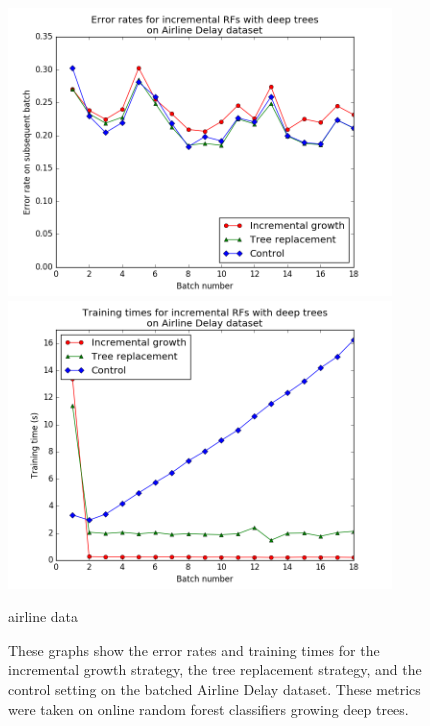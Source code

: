 \begin{figure}
  \centering
  \includegraphics[width=4in]{planedeep_line}
  \includegraphics[width=4in]{planedeep_line_time}
  \caption{airline data}
  \caption{These graphs show the error rates and training times for the
incremental growth strategy, the tree replacement strategy, and the control
setting on the batched Airline Delay dataset. These metrics
were taken on online random forest classifiers growing deep trees.}
  \label{fig:plane1}
\end{figure}


